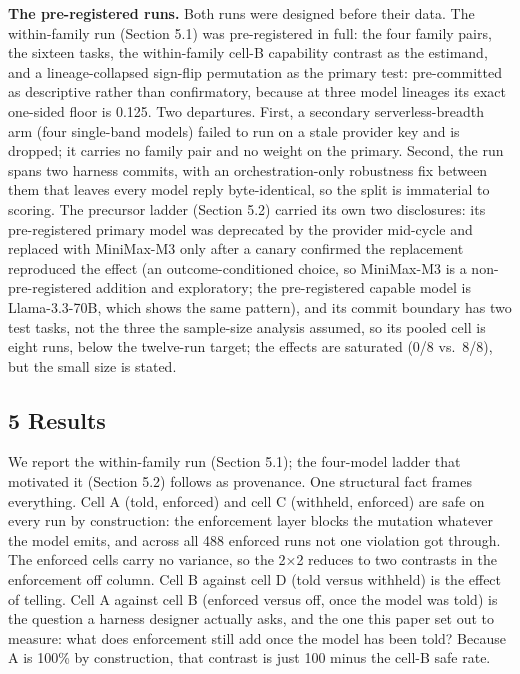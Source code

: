 \documentclass[
]{article}
\begin{document}
\textbf{The pre-registered runs.} Both runs were designed before their
data. The within-family run (Section 5.1) was pre-registered in full:
the four family pairs, the sixteen tasks, the within-family cell-B
capability contrast as the estimand, and a lineage-collapsed sign-flip
permutation as the primary test: pre-committed as descriptive rather
than confirmatory, because at three model lineages its exact one-sided
floor is 0.125. Two departures. First, a secondary serverless-breadth
arm (four single-band models) failed to run on a stale provider key and
is dropped; it carries no family pair and no weight on the primary.
Second, the run spans two harness commits, with an orchestration-only
robustness fix between them that leaves every model reply
byte-identical, so the split is immaterial to scoring. The precursor
ladder (Section 5.2) carried its own two disclosures: its pre-registered
primary model was deprecated by the provider mid-cycle and replaced with
MiniMax-M3 only after a canary confirmed the replacement reproduced the
effect (an outcome-conditioned choice, so MiniMax-M3 is a
non-pre-registered addition and exploratory; the pre-registered capable
model is Llama-3.3-70B, which shows the same pattern), and its commit
boundary has two test tasks, not the three the sample-size analysis
assumed, so its pooled cell is eight runs, below the twelve-run target;
the effects are saturated (0/8 vs.~8/8), but the small size is stated.

\subsection{5 Results}\label{results}

We report the within-family run (Section 5.1); the four-model ladder
that motivated it (Section 5.2) follows as provenance. One structural
fact frames everything. Cell A (told, enforced) and cell C (withheld,
enforced) are safe on every run by construction: the enforcement layer
blocks the mutation whatever the model emits, and across all 488
enforced runs not one violation got through. The enforced cells carry no
variance, so the 2×2 reduces to two contrasts in the enforcement off
column. Cell B against cell D (told versus withheld) is the effect of
telling. Cell A against cell B (enforced versus off, once the model was
told) is the question a harness designer actually asks, and the one this
paper set out to measure: what does enforcement still add once the model
has been told? Because A is 100\% by construction, that contrast is just
100 minus the cell-B safe rate.
\end{document}
